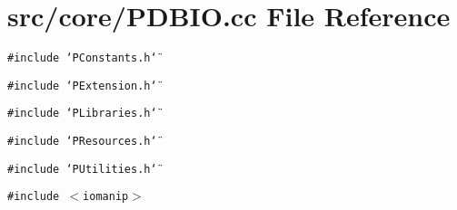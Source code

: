 \section{src/core/PDBIO.cc File Reference}
\label{PDBIO_8cc}


{\tt \#include \char`\"{}PConstants.h\char`\"{}}\par
{\tt \#include \char`\"{}PExtension.h\char`\"{}}\par
{\tt \#include \char`\"{}PLibraries.h\char`\"{}}\par
{\tt \#include \char`\"{}PResources.h\char`\"{}}\par
{\tt \#include \char`\"{}PUtilities.h\char`\"{}}\par
{\tt \#include $<$iomanip$>$}\par
